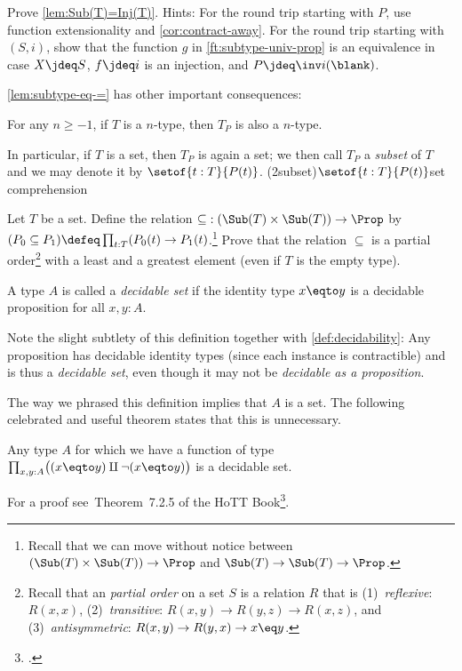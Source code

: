 \begin{xca}\label{xca:Sub(T)=Inj(T)}
Prove \cref{lem:Sub(T)=Inj(T)}. Hints: %
For the round trip starting with $P$, use function extensionality and
\cref{cor:contract-away}. For the round trip starting with $(S,i)$,
show that the function $g$ in \cref{ft:subtype-univ-prop} is an equivalence
in case $X\jdeq S$, $f\jdeq i$ is an injection, and $P\jdeq\inv i(\blank)$.
\end{xca}

\cref{lem:subtype-eq-=} has other important consequences:
\begin{corollary}\label{cor:subtype-same-level}
  For any $n\geq -1$,
  if $T$ is a $n$-type, then $T_P$ is also a $n$-type.
\end{corollary}
In particular, if $T$ is a set, then $T_P$ is again a set;
we then call $T_P$ a \emph{subset} of $T$ and we may denote it by
$\setof{t:T}{P(t)}$.\footnotemark
\glossary(2subset){$\setof{t:T}{P(t)}$}{set comprehension}

\begin{xca}\label{xca:subsets-inclusion}
  Let $T$ be a set. 
  Define the relation ${\subseteq}: (\Sub(T)\times\Sub(T))\to\Prop$ 
  by $(P_0 \subseteq P_1) \defeq \prod_{t:T}(P_0(t)\to P_1(t)$.\footnote{%
  Recall that we can move without notice between 
  $(\Sub(T)\times\Sub(T))\to\Prop$ and $\Sub(T)\to\Sub(T)\to\Prop$.} 
  Prove that the relation ${\subseteq}$ is a partial
  order\footnote{\label{ft:partial-order}%
    Recall that an \emph{partial order} on a set $S$ is a relation $R$ that is
    (1)~\emph{reflexive}: $R(x,x)$,
    (2)~\emph{transitive}: $R(x,y) \to R(y,z) \to R(x,z)$, and
    (3)~\emph{antisymmetric}: $R(x,y) \to R(y,x) \to x\eq y$.}
  with a least and a greatest element (even if $T$ is the empty type).
\end{xca}

\begin{definition}\label{def:decidable-set}
  A type $A$ is called a \emph{decidable set} if the identity type $x \eqto y$
  is a decidable proposition for all $x,y:A$.
\end{definition}
Note the slight subtlety of this definition together with
\cref{def:decidability}: Any proposition has decidable identity types
(since each instance is contractible) and is thus a \emph{decidable set},
even though it may not be \emph{decidable as a proposition}.

The way we phrased this definition implies that $A$ is a set.
The following celebrated and useful theorem states that this is unnecessary.
\begin{theorem}[Hedberg]\label{thm:hedberg}
  Any type $A$ for which we have a function of type
  $\prod_{x,y:A}\bigl((x \eqto y) \amalg \lnot(x \eqto y)\bigr)$
  is a decidable set.
\end{theorem}
For a proof see~Theorem~7.2.5 of the HoTT Book\footcite{hottbook}.

